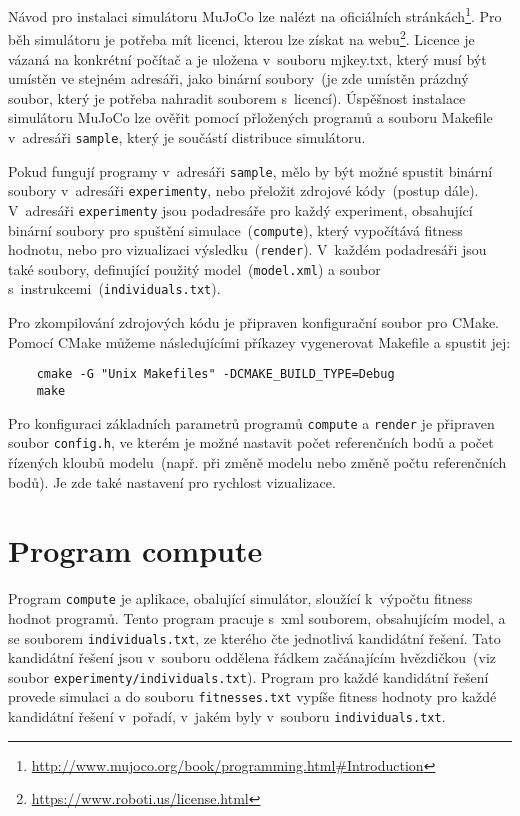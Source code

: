 Návod pro instalaci simulátoru MuJoCo lze nalézt na oficiálních stránkách\footnote{\url{http://www.mujoco.org/book/programming.html\#Introduction}}.
Pro běh simulátoru je potřeba mít licenci, kterou lze získat na webu\footnote{\url{https://www.roboti.us/license.html}}.
Licence je vázaná na konkrétní počítač a je uložena v~souboru mjkey.txt, který musí být umístěn ve stejném adresáři, jako binární soubory~(je zde umístěn prázdný soubor, který je potřeba nahradit souborem s~licencí).
Úspěšnost instalace simulátoru MuJoCo lze ověřit pomocí přložených programů a souboru Makefile v~adresáři \texttt{sample}, který je součástí distribuce simulátoru.

Pokud fungují programy v~adresáři \texttt{sample}, mělo by být možné spustit binární soubory v~adresáři \texttt{experimenty}, nebo přeložit zdrojové kódy~(postup dále).
V~adresáři \texttt{experimenty} jsou podadresáře pro každý experiment, obsahující binární soubory pro spuštění simulace~(\texttt{compute}), který vypočítává fitness hodnotu, nebo pro vizualizaci výsledku~(\texttt{render}).
V~každém podadresáři jsou také soubory, definující použitý model~(\texttt{model.xml}) a soubor s~instrukcemi~(\texttt{individuals.txt}).

Pro zkompilování zdrojových kódu je připraven konfigurační soubor pro CMake.
Pomocí CMake můžeme následujícími příkazey vygenerovat Makefile a spustit jej:
\begin{verbatim}
    cmake -G "Unix Makefiles" -DCMAKE_BUILD_TYPE=Debug
    make
\end{verbatim}

Pro konfiguraci základních parametrů programů \texttt{compute} a \texttt{render} je připraven soubor \texttt{config.h}, ve kterém je možné nastavit počet referenčních bodů a počet řízených kloubů modelu~(např. při změně modelu nebo změně počtu referenčních bodů).
Je zde také nastavení pro rychlost vizualizace.


\section{Program compute}
Program \texttt{compute} je aplikace, obalující simulátor, sloužící k~výpočtu fitness hodnot programů.
Tento program pracuje s~xml souborem, obsahujícím model, a se souborem \texttt{individuals.txt}, ze kterého čte jednotlivá kandidátní řešení.
Tato kandidátní řešení jsou v~souboru oddělena řádkem začánajícím hvězdičkou~(viz soubor \texttt{experimenty/individuals.txt}).
Program pro každé kandidátní řešení provede simulaci a do souboru \texttt{fitnesses.txt} vypíše fitness hodnoty pro každé kandidátní řešení v~pořadí, v~jakém byly v~souboru \texttt{individuals.txt}.

